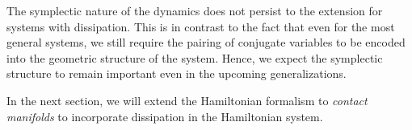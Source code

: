 The symplectic nature of the dynamics does not persist to the extension for systems with dissipation. This is in contrast to the fact that even for the most general systems, we still require the pairing of conjugate variables to be encoded into the geometric structure of the system. Hence, we expect the symplectic structure to remain important even in the upcoming generalizations.

In the next section, we will extend the Hamiltonian formalism to \emph{contact manifolds} to incorporate dissipation in the Hamiltonian system.
